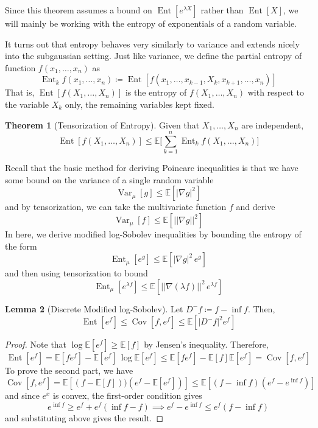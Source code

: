 \documentclass{article}
\DeclareMathOperator{\Cov}{Cov}
\DeclareMathOperator{\Var}{Var}
\DeclareMathOperator{\Ent}{Ent}
\theoremstyle{definition}
\newtheorem{theorem}{Theorem}[section]
\newtheorem{lemma}[theorem]{Lemma}
\theoremstyle{remark}
\theoremstyle{definition}
\begin{document}
Since this theorem assumes a bound on $\Ent[e^{\lambda X}]$ rather than $\Ent[X]$, we will mainly be working with the entropy of exponentials of a random variable. 

It turns out that entropy behaves very similarly to variance and extends nicely into the subgaussian setting. Just like variance, we define the partial entropy of function $f(x_1, \ldots, x_n)$ as 
\[\Ent_k f (x_1, \ldots, x_n) \coloneqq \Ent[ f(x_1, \ldots, x_{k-1}, X_k , x_{k+1}, \ldots, x_n)]\]
That is, $\Ent[f(X_1, \ldots, X_n)]$ is the entropy of $f(X_1, \ldots, X_n)$ with respect to the variable $X_k$ only, the remaining variables kept fixed. 

\begin{theorem}[Tensorization of Entropy]
Given that $X_1, \ldots, X_n$ are independent, 
\[\Ent[ f(X_1, \ldots, X_n)] \leq \mathbb{E} \bigg[ \sum_{k=1}^n \Ent_k f (X_1, \ldots, X_n) \bigg]\]
\end{theorem}

Recall that the basic method for deriving Poincare inequalities is that we have some bound on the variance of a single random variable 
\[\Var_\mu [g] \leq \mathbb{E}[|\nabla g|^2]\]
and by tensorization, we can take the multivariate function $f$ and derive 
\[\Var_\mu [f] \leq \mathbb{E}[ ||\nabla g||^2 ]\]
In here, we derive modified log-Sobolev inequalities by bounding the entropy of the form 
\[\Ent_\mu [e^g] \leq \mathbb{E}[ |\nabla g|^2 \, e^g ]\]
and then using tensorization to bound 
\[\Ent_\mu [e^{\lambda f}] \leq \mathbb{E} [ ||\nabla (\lambda f)||^2 \, e^{\lambda f} ]\]

\begin{lemma}[Discrete Modified log-Sobolev]
Let $D^- f \coloneqq f - \inf f$. Then, 
\[\Ent[e^f] \leq \Cov[f, e^f] \leq \mathbb{E}[|D^- f|^2 e^f]\]
\end{lemma}
\begin{proof}
Note that $\log \mathbb{E}[e^f] \geq \mathbb{E}[f]$ by Jensen's inequality. Therefore, 
\[\Ent[e^f] = \mathbb{E}[f e^f] - \mathbb{E}[e^f] \, \log \mathbb{E}[e^f] \leq \mathbb{E}[f e^f] - \mathbb{E}[f] \mathbb{E}[e^f] = \Cov[f, e^f]\]
To prove the second part, we have 
\[\Cov[f, e^f] = \mathbb{E}[(f - \mathbb{E}[f]))(e^f - \mathbb{E}[e^f])] \leq \mathbb{E}[(f - \inf f)(e^f - e^{\inf f})] \]
and since $e^x$ is convex, the first-order condition gives 
\[e^{\inf f} \geq e^f + e^f (\inf f - f) \implies e^f - e^{\inf f} \leq e^f (f - \inf f)\]
and substituting above gives the result. 
\end{proof}
\end{document}
